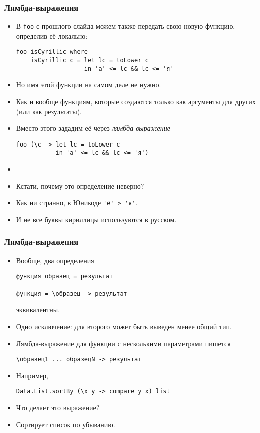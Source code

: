 \documentclass[10pt]{beamer}
\begin{document}
\begin{frame}[fragile]
  \frametitle{Лямбда-выражения}
  \begin{itemize}
    \item В \lstinline|foo| с прошлого слайда можем также передать свою новую функцию, определив её локально:
          \begin{lstlisting}
foo isCyrillic where 
    isCyrillic c = let lc = toLower c
                   in 'а' <= lc && lc <= 'я'
\end{lstlisting}\pause
    \item Но имя этой функции на самом деле не нужно.
    \item Как и вообще функциям, которые создаются только как аргументы для других (или как результаты).\pause
    \item Вместо этого зададим её через \emph{лямбда-выражение}
          \begin{lstlisting}
foo (\c -> let lc = toLower c 
           in 'а' <= lc && lc <= 'я')
\end{lstlisting}
          \pause
    \item[]
    \item Кстати, почему это определение неверно?
          \pause
    \item Как ни странно, в Юникоде \lstinline|'ё' > 'я'|.
    \item И не все буквы кириллицы используются в русском.
  \end{itemize}
\end{frame}

\begin{frame}[fragile]
  \frametitle{Лямбда-выражения}
  \begin{itemize}
    \item Вообще, два определения
          \begin{lstlisting}
функция образец = результат

функция = \образец -> результат
\end{lstlisting}
          эквивалентны.\pause
    \item Одно исключение: \href{https://wiki.haskell.org/Monomorphism_restriction}{для второго может быть выведен менее общий тип}.\pause
    \item Лямбда-выражение для функции с несколькими параметрами пишется
          \begin{lstlisting}
\образец1 ... образецN -> результат
\end{lstlisting}\pause
    \item Например,
          \begin{lstlisting}
Data.List.sortBy (\x y -> compare y x) list
\end{lstlisting}
    \item Что делает это выражение?\pause
    \item Сортирует список по убыванию.
  \end{itemize}
\end{frame}
\end{document}

